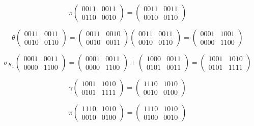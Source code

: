 \documentclass[a4paper]{article}
\begin{document}
$$\pi \begin{pmatrix} 0011 & 0011 \\ 0110 & 0010 \end{pmatrix} = \begin{pmatrix} 0011 & 0011 \\ 0010 & 0110 \end{pmatrix}$$

$$\theta \begin{pmatrix} 0011 & 0011 \\ 0010 & 0110 \end{pmatrix} = \begin{pmatrix} 0011 & 0010 \\ 0010 & 0011 \end{pmatrix}\begin{pmatrix} 0011 & 0011 \\ 0010 & 0110 \end{pmatrix} = \begin{pmatrix} 0001 & 1001 \\ 0000 & 1100 \end{pmatrix}$$

$$\sigma_{K_1} \begin{pmatrix} 0001 & 0011 \\ 0000 & 1100 \end{pmatrix} = \begin{pmatrix} 0001 & 0011 \\ 0000 & 1100 \end{pmatrix} + \begin{pmatrix} 1000 & 0011 \\ 0101 & 0011 \end{pmatrix} = \begin{pmatrix} 1001 & 1010 \\ 0101 & 1111 \end{pmatrix}$$

$$\gamma \begin{pmatrix} 1001 & 1010 \\ 0101 & 1111 \end{pmatrix} = \begin{pmatrix} 1110 & 1010 \\ 0010 & 0100 \end{pmatrix}$$

$$\pi \begin{pmatrix} 1110 & 1010 \\ 0010 & 0100 \end{pmatrix} = \begin{pmatrix} 1110 & 1010 \\ 0100 & 0010 \end{pmatrix}$$
\end{document}
